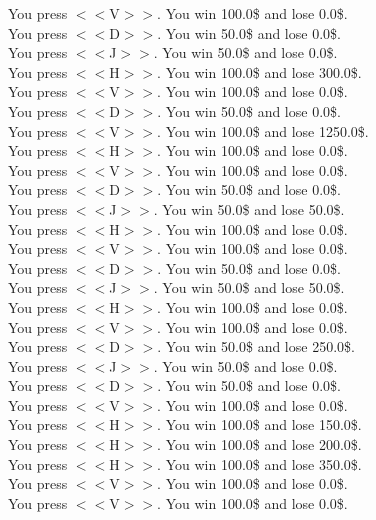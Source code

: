 \documentclass[pdflatex,sn-nature]{sn-jnl}%
\theoremstyle{thmstyleone}%
\theoremstyle{thmstyletwo}%
\theoremstyle{thmstylethree}%
\begin{document}
You press $<<$V$>>$. You win 100.0\$ and lose 0.0\$. $~$\\ 
You press $<<$D$>>$. You win 50.0\$ and lose 0.0\$. $~$\\ 
You press $<<$J$>>$. You win 50.0\$ and lose 0.0\$. $~$\\ 
You press $<<$H$>>$. You win 100.0\$ and lose 300.0\$. $~$\\ 
You press $<<$V$>>$. You win 100.0\$ and lose 0.0\$. $~$\\ 
You press $<<$D$>>$. You win 50.0\$ and lose 0.0\$. $~$\\ 
You press $<<$V$>>$. You win 100.0\$ and lose 1250.0\$. $~$\\ 
You press $<<$H$>>$. You win 100.0\$ and lose 0.0\$. $~$\\ 
You press $<<$V$>>$. You win 100.0\$ and lose 0.0\$. $~$\\ 
You press $<<$D$>>$. You win 50.0\$ and lose 0.0\$. $~$\\ 
You press $<<$J$>>$. You win 50.0\$ and lose 50.0\$. $~$\\ 
You press $<<$H$>>$. You win 100.0\$ and lose 0.0\$. $~$\\ 
You press $<<$V$>>$. You win 100.0\$ and lose 0.0\$. $~$\\ 
You press $<<$D$>>$. You win 50.0\$ and lose 0.0\$. $~$\\ 
You press $<<$J$>>$. You win 50.0\$ and lose 50.0\$. $~$\\ 
You press $<<$H$>>$. You win 100.0\$ and lose 0.0\$. $~$\\ 
You press $<<$V$>>$. You win 100.0\$ and lose 0.0\$. $~$\\ 
You press $<<$D$>>$. You win 50.0\$ and lose 250.0\$. $~$\\ 
You press $<<$J$>>$. You win 50.0\$ and lose 0.0\$. $~$\\ 
You press $<<$D$>>$. You win 50.0\$ and lose 0.0\$. $~$\\ 
You press $<<$V$>>$. You win 100.0\$ and lose 0.0\$. $~$\\ 
You press $<<$H$>>$. You win 100.0\$ and lose 150.0\$. $~$\\ 
You press $<<$H$>>$. You win 100.0\$ and lose 200.0\$. $~$\\ 
You press $<<$H$>>$. You win 100.0\$ and lose 350.0\$. $~$\\ 
You press $<<$V$>>$. You win 100.0\$ and lose 0.0\$. $~$\\ 
You press $<<$V$>>$. You win 100.0\$ and lose 0.0\$. $~$\\ 
\end{document}
